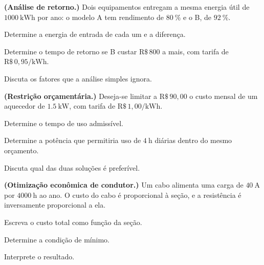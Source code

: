 \begin{questao}[4]{}

\textbf{(Análise de retorno.)} Dois equipamentos entregam a mesma energia útil
de $\SI{1000}{\kilo\watt\hour}$ por ano: o modelo A tem rendimento de
$\SI{80}{\percent}$ e o B, de $\SI{92}{\percent}$.
\begin{itensq}
\item Determine a energia de entrada de cada um e a diferença.
\item Determine o tempo de retorno se B custar $\mathrm{R\$}\,800$ a mais, com
      tarifa de $\mathrm{R\$}\,0{,}95/\si{\kilo\watt\hour}$.
\item Discuta os fatores que a análise simples ignora.
\end{itensq}


\end{questao}
\begin{questao}[4]{}

\textbf{(Restrição orçamentária.)} Deseja-se limitar a
$\mathrm{R\$}\,90{,}00$ o custo mensal de um aquecedor de
$\SI{1.5}{\kilo\watt}$, com tarifa de
$\mathrm{R\$}\,1{,}00/\si{\kilo\watt\hour}$.
\begin{itensq}
\item Determine o tempo de uso admissível.
\item Determine a potência que permitiria uso de $\SI{4}{\hour}$ diárias dentro
      do mesmo orçamento.
\item Discuta qual das duas soluções é preferível.
\end{itensq}


\end{questao}
\begin{questao}[4]{}

\textbf{(Otimização econômica de condutor.)} Um cabo alimenta uma carga de
$\SI{40}{\ampere}$ por $\SI{4000}{\hour}$ ao ano. O custo do cabo é
proporcional à seção, e a resistência é inversamente proporcional a ela.
\begin{itensq}
\item Escreva o custo total como função da seção.
\item Determine a condição de mínimo.
\item Interprete o resultado.
\end{itensq}


\end{questao}
